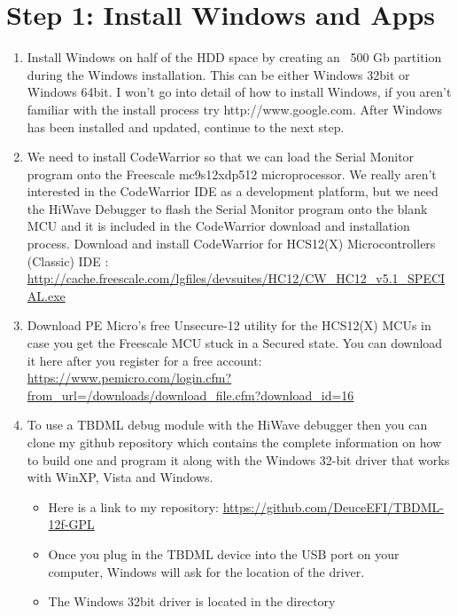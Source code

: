 \documentclass[12pt,notitlepage,onecolumn,oneside,openany,draft]{memoir}
\begin{document}
\chapter{\textsf{Step 1:  Install Windows and Apps}}
\begin{enumerate}
\item \textsf{Install Windows on half of the HDD space by creating an ~500 Gb partition during the Windows installation.}
\textsf{This can be either Windows 32bit or Windows 64bit.  I won't go into detail of how to install Windows, if you aren't familiar with the install process try http://www.google.com.  After Windows has been installed and updated, continue to the next step.}

\item \textsf{We need to install CodeWarrior so that we can load the Serial Monitor program onto the Freescale mc9s12xdp512 microprocessor.  We really aren't interested in the CodeWarrior IDE as a development platform, but we need the HiWave Debugger to flash the Serial Monitor program onto the blank MCU and it is included in the CodeWarrior download and installation process.}\newline
      \textsf{Download and install CodeWarrior for HCS12(X) Microcontrollers (Classic) IDE :} \newline
      \url{http://cache.freescale.com/lgfiles/devsuites/HC12/CW_HC12_v5.1_SPECIAL.exe}

\item \textsf{Download PE Micro's free Unsecure-12 utility for the HCS12(X) MCUs in case you get the Freescale MCU stuck in a Secured state. You can download it here after you register for a free account:} \newline
\url{https://www.pemicro.com/login.cfm?from_url=/downloads/download_file.cfm?download_id=16}

\item \textsf{To use a TBDML debug module with the HiWave debugger then you can clone my github repository which contains the complete information on how to build one and program it along with the Windows 32-bit driver that works with WinXP, Vista and Windows.} 
\begin{itemize}
      \item \textsf{Here is a link to my repository:} \newline
            \url{https://github.com/DeuceEFI/TBDML-12f-GPL}
      \item \textsf{Once you plug in the TBDML device into the USB port on your computer, Windows will ask for the location of the driver.} 
      \item \textsf{The Windows 32bit driver is located in the  directory}  
\end{itemize}


\end{enumerate}
\end{document}
